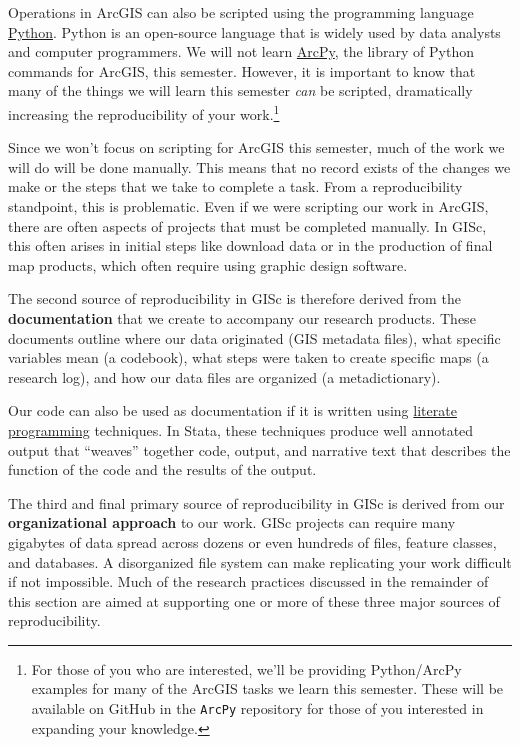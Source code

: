 \documentclass[]{book}
\let\rmarkdownfootnote\footnote%
\def\footnote{\protect\rmarkdownfootnote}
\theoremstyle{definition}
\theoremstyle{definition}
\theoremstyle{remark}
\begin{document}
Operations in ArcGIS can also be scripted using the programming language
\href{https://www.python.org}{Python}. Python is an open-source language
that is widely used by data analysts and computer programmers. We will
not learn
\href{http://pro.arcgis.com/en/pro-app/arcpy/get-started/what-is-arcpy-.htm}{ArcPy},
the library of Python commands for ArcGIS, this semester. However, it is
important to know that many of the things we will learn this semester
\emph{can} be scripted, dramatically increasing the reproducibility of
your work.\footnote{For those of you who are interested, we'll be
  providing Python/ArcPy examples for many of the ArcGIS tasks we learn
  this semester. These will be available on GitHub in the \texttt{ArcPy}
  repository for those of you interested in expanding your knowledge.}

Since we won't focus on scripting for ArcGIS this semester, much of the
work we will do will be done manually. This means that no record exists
of the changes we make or the steps that we take to complete a task.
From a reproducibility standpoint, this is problematic. Even if we were
scripting our work in ArcGIS, there are often aspects of projects that
must be completed manually. In GISc, this often arises in initial steps
like download data or in the production of final map products, which
often require using graphic design software.

The second source of reproducibility in GISc is therefore derived from
the \textbf{documentation} that we create to accompany our research
products. These documents outline where our data originated (GIS
metadata files), what specific variables mean (a codebook), what steps
were taken to create specific maps (a research log), and how our data
files are organized (a metadictionary).

Our code can also be used as documentation if it is written using
\href{https://en.wikipedia.org/wiki/Literate_programming}{literate
programming} techniques. In Stata, these techniques produce well
annotated output that ``weaves'' together code, output, and narrative
text that describes the function of the code and the results of the
output.

The third and final primary source of reproducibility in GISc is derived
from our \textbf{organizational approach} to our work. GISc projects can
require many gigabytes of data spread across dozens or even hundreds of
files, feature classes, and databases. A disorganized file system can
make replicating your work difficult if not impossible. Much of the
research practices discussed in the remainder of this section are aimed
at supporting one or more of these three major sources of
reproducibility.
\end{document}
